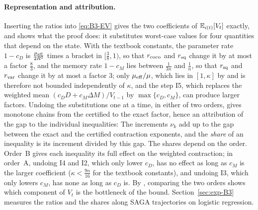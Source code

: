 \paragraph{Representation and attribution.}
Inserting the ratios into \eqref{eq:B3-EV} gives the two coefficients of $\mathbb{E}_{i(t)}[V_t]$ exactly, and shows what the proof
does: it substitutes worst-case values for four quantities that depend on the state.
With the textbook constants, the parameter rate $1-c_D$ is $\frac{\mu_{\mathrm{eff}}}{2R^2}$ times a bracket in $[\frac38,1)$, so
that $r_{\rm coco}$ and $r_{\rm sq}$ change it by at most a factor $\frac83$, and the memory rate $1-c_M$ lies between
$\frac1{3n}$ and $\frac1n$, so that $r_{\rm sq}$ and $r_{\rm var}$ change it by at most a factor $3$; only $\mu_{\mathrm{eff}}/\mu$,
which lies in $[1,\kappa]$ by  and is therefore not bounded independently of $\kappa$, and the
step I5, which replaces the weighted mean $(c_DD+c_M\Delta M)/V_{t-1}$ by $\max\{c_D,c_M\}$,
can produce larger factors. Undoing the substitutions one at a time, in either of two orders, gives monotone chains from the
certified to the exact factor, hence an attribution of the gap to the individual inequalities:
The increments $\nu_k$ add up to the gap between the exact and the certified contraction exponents, and the
\emph{share} of an inequality is its increment divided by this gap. The shares depend on the order. Order~B gives each
inequality its full effect on the weighted contraction; in order~A, undoing I4 and I2, which only lower $c_D$, has no
effect as long as $c_M$ is the larger coefficient ($\kappa<\frac{9n}{16}$ for the textbook constants), and undoing I3,
which only lowers $c_M$, has none as long as $c_D$ is. By , comparing the two orders shows which
component of $V_t$ is the bottleneck of the bound. Section~\ref{sec:exp-B3} measures the ratios and the shares along
SAGA trajectories on logistic regression.

